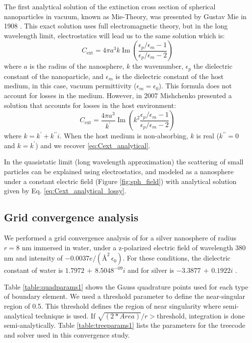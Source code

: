 The first analytical solution of the extinction cross section of spherical 
nanoparticles in vacuum, known as Mie-Theory, was presented by Gustav Mie in 1908
\cite{Mie1908}. This exact solution uses full electromagnetic theory, but in the 
long wavelength limit, electrostatics will lead us to the same solution 
\cite{BohrenHuffman1983} which is:
%
\begin{equation} \label{eq:Cext_analytical}
    C_\text{ext} = 4\pi a^3 k \operatorname{Im}\left(\frac{\epsilon_p/\epsilon_m -1}{\epsilon_p/\epsilon_m -2}\right)
\end{equation}
%
where $a$ is the radius of the nanosphere, $k$ the wavenumber, 
$\epsilon_p$ the dielectric constant of the nanoparticle, and $\epsilon_m$ is the
dielectric constant of the host medium, in this case,  vacuum permittivity
($\epsilon_m = \epsilon_0$).  This formula does not account for losses in the medium.
However, in 2007 Mishchenko \cite{Mishchenko2007} presented a solution that accounts for losses in
the host environment:
%
\begin{equation} \label{eq:Cext_analytical_lossy}
    C_\text{ext} = \frac{4\pi a^3}{k^\prime} \operatorname{Im}\left(k^2 \frac{\epsilon_p/\epsilon_m -1}{\epsilon_p/\epsilon_m -2}\right)
\end{equation}
%
where $k=k^\prime + k^{\prime\prime}i$. When the host medium is 
non-absorbing, $k$ is real ($k^{\prime\prime} = 0$ and $k=k^\prime$) and we 
recover \eqref{eq:Cext_analytical}. 

In the quasistatic limit (long wavelength approximation) the scattering 
of small particles can be explained using electrostatics, and modeled as
a nanosphere under a constant electric field (Figure \ref{fig:sph_field}) 
with analytical solution given by Eq. \eqref{eq:Cext_analytical_lossy}.

\subsection{Grid convergence analysis}\label{sub_sec:grid_conv_iso}

We performed a grid convergence analysis of \pygbe for a silver nanosphere 
of radius $r=8$ nm immersed in water, under a z-polarized electric field
of wavelength 380 nm and intensity of $-0.0037 e/(\text{\AA}^2 \, \epsilon_0)$.
For these conditions, the dielectric constant of water is
$1.7972 \, + \, 8.5048^{-09}i$ \cite{HaleQuerry1972} and for silver is
$-3.3877 \, + \, 0.1922i$ \cite{JohnsonChristy1972}. 

Table  \ref{table:quadparams1} shows the Gauss quadrature points used for each 
type of boundary element. We used a threshold parameter to define the near-singular
region of 0.5. This threshold defines the region of near singularity where 
semi-analytical technique is used. If $\sqrt{(2*Area)}/r > \text{threshold}$,
integration is done semi-analytically.
Table \ref{table:treeparams1} lists the parameters for the treecode and solver 
used in this convergence study.

